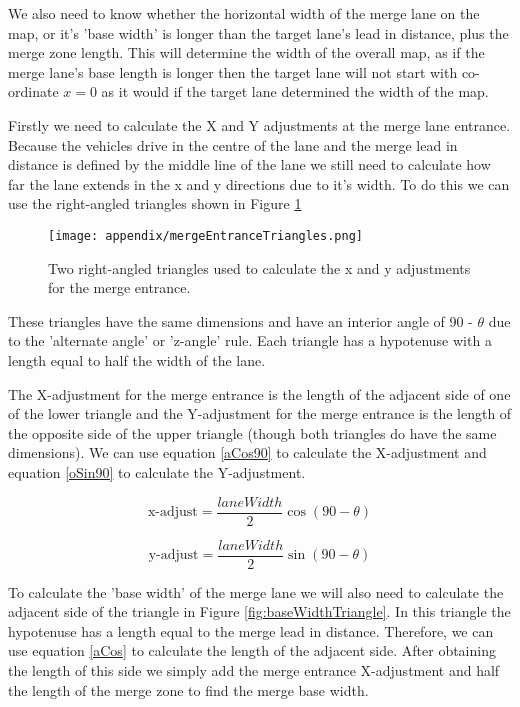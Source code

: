 \begin{appendices}
We also need to know whether the horizontal width of the merge lane on the map, or it's 'base width' is longer than the target lane's lead in distance, plus the merge zone length. This will determine the width of the overall map, as if the merge lane's base length is longer then the target lane will not start with co-ordinate $x=0$ as it would if the target lane determined the width of the map.

Firstly we need to calculate the X and Y adjustments at the merge lane entrance. Because the vehicles drive in the centre of the lane and the merge lead in distance is defined by the middle line of the lane we still need to calculate how far the lane extends in the x and y directions due to it's width. To do this we can use the right-angled triangles shown in Figure \ref{fig:mergeEntranceTriangles}

\begin{figure}[htb]
\centering
\texttt{[image: appendix/mergeEntranceTriangles.png]}
\caption{Two right-angled triangles used to calculate the x and y adjustments for the merge entrance.}
\label{fig:mergeEntranceTriangles}
\end{figure}

These triangles have the same dimensions and have an interior angle of 90 - $\theta$ due to the 'alternate angle' or 'z-angle' rule. Each triangle has a hypotenuse with a length equal to half the width of the lane. 

The X-adjustment for the merge entrance is the length of the adjacent side of one of the lower triangle and the Y-adjustment for the merge entrance is the length of the opposite side of the upper triangle (though both triangles do have the same dimensions). We can use equation \ref{aCos90} to calculate the X-adjustment and equation \ref{oSin90} to calculate the Y-adjustment.

\begin{equation}\label{aCos90}
\text{x-adjust} = \frac{laneWidth}{2} \cos(90 - \theta)
\end{equation}

\begin{equation}\label{oSin90}
\text{y-adjust} = \frac{laneWidth}{2} \sin(90 - \theta)
\end{equation}

To calculate the 'base width' of the merge lane we will also need to calculate the adjacent side of the triangle in Figure \ref{fig:baseWidthTriangle}. In this triangle the hypotenuse has a length equal to the merge lead in distance. Therefore, we can use equation \ref{aCos} to calculate the length of the adjacent side. After obtaining the length of this side we simply add the merge entrance X-adjustment and half the length of the merge zone to find the merge base width.


\end{appendices}
